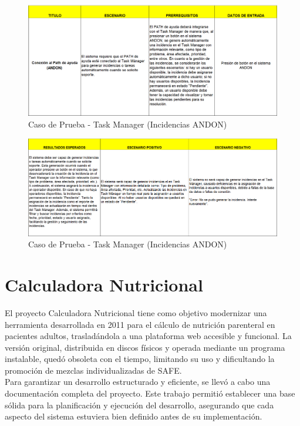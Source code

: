 \documentclass[12pt,letterpaper,spanish, xcolor=table]{report}
\numberwithin{figure}{subsection}
\begin{document}
	\begin{figure}[H]
		\centering
		\includegraphics[width=1.0\textwidth]
		{Imagenes/PathAyuda/CPTask.png}
		\caption{Caso de Prueba - Task Manager (Incidencias ANDON)
		}\label{a2}
	\end{figure}
	
	\begin{figure}[H]
		\centering
		\includegraphics[width=1.0\textwidth]
		{Imagenes/PathAyuda/CPTask2.png}
		\caption{Caso de Prueba - Task Manager (Incidencias ANDON)
		}\label{a2}
	\end{figure}
	
	\newpage
	

\section{Calculadora Nutricional}

	El proyecto Calculadora Nutricional tiene como objetivo modernizar una herramienta desarrollada en 2011 para el cálculo de nutrición parenteral en pacientes adultos, trasladándola a una plataforma web accesible y funcional. La versión original, distribuida en discos físicos y operada mediante un programa instalable, quedó obsoleta con el tiempo, limitando su uso y dificultando la promoción de mezclas individualizadas de SAFE.\\
	
	Para garantizar un desarrollo estructurado y eficiente, se llevó a cabo una documentación completa del proyecto. Este trabajo permitió establecer una base sólida para la planificación y ejecución del desarrollo, asegurando que cada aspecto del sistema estuviera bien definido antes de su implementación.\\
	
\end{document}
